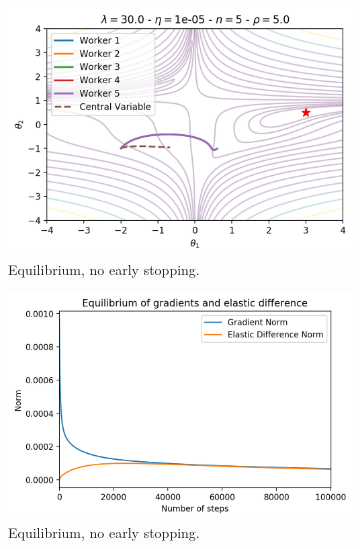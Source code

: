\begin{figure}[H]
  \centering
  \begin{subfigure}{.49\textwidth}
    \centering
    \includegraphics[width=\linewidth]{resources/images/easgd_sync_norm_space.png}
    \caption{Equilibrium, no early stopping.}
  \end{subfigure}
  \begin{subfigure}{.49\textwidth}
    \centering
    \includegraphics[width=\linewidth]{resources/images/easgd_sync_norm_equilibrium.png}
    \caption{Equilibrium, no early stopping.}
  \end{subfigure}
  \begin{subfigure}{.49\textwidth}
    \centering

\end{subfigure}
\end{figure}

